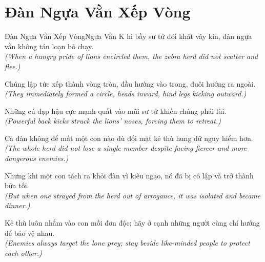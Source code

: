 \section{Đàn Ngựa Vằn Xếp Vòng}
\begin{truyen}{Đàn Ngựa Vằn Xếp Vòng}{Ngựa Vằn}
K hi bầy sư tử đói khát vây kín, đàn ngựa vằn không tán loạn bỏ chạy.\\
\textit{(When a hungry pride of lions encircled them, the zebra herd did not scatter and flee.)}

Chúng lập tức xếp thành vòng tròn, đầu hướng vào trong, đuôi hướng ra ngoài.\\
\textit{(They immediately formed a circle, heads inward, hind legs kicking outward.)}

Những cú đạp hậu cực mạnh quất vào mũi sư tử khiến chúng phải lùi.\\
\textit{(Powerful back kicks struck the lions' noses, forcing them to retreat.)}

Cả đàn không để mất một con nào dù đối mặt kẻ thù hung dữ nguy hiểm hơn.\\
\textit{(The whole herd did not lose a single member despite facing fiercer and more dangerous enemies.)}

Nhưng khi một con tách ra khỏi đàn vì kiêu ngạo, nó đã bị cô lập và trở thành bữa tối.\\
\textit{(But when one strayed from the herd out of arrogance, it was isolated and became dinner.)}

\end{truyen}
\begin{baihoc}
  Kẻ thù luôn nhắm vào con mồi đơn độc; hãy ở cạnh những người cùng chí hướng để bảo vệ nhau.\\
  \textit{(Enemies always target the lone prey; stay beside like-minded people to protect each other.)}
\end{baihoc}

